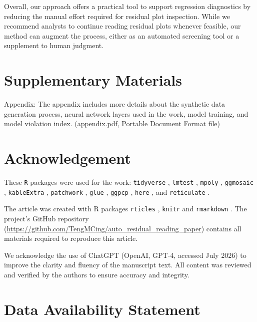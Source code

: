\documentclass[]{interact}
\theoremstyle{plain}%
\theoremstyle{definition}
\theoremstyle{remark}
\begin{document}
Overall, our approach offers a practical tool to support regression
diagnostics by reducing the manual effort required for residual plot
inspection. While we recommend analysts to continue reading residual
plots whenever feasible, our method can augment the process, either as
an automated screening tool or a supplement to human judgment.

\section*{Supplementary Materials}\label{supplementary-materials}

\begin{description}
\item{Appendix:} The appendix includes more details about the synthetic data generation process, neural network layers used in the work, model training, and model violation index. (appendix.pdf, Portable Document Format file)
\end{description}

\section*{Acknowledgement}\label{acknowledgement}

These \texttt{R} packages were used for the work: \texttt{tidyverse}
\citep{tidyverse}, \texttt{lmtest} \citep{lmtest}, \texttt{mpoly}
\citep{mpoly}, \texttt{ggmosaic} \citep{ggmosaic}, \texttt{kableExtra}
\citep{kableextra}, \texttt{patchwork} \citep{patchwork}, \texttt{glue}
\citep{glue}, \texttt{ggpcp} \citep{ggpcp}, \texttt{here} \citep{here},
and \texttt{reticulate} \citep{reticulate}.

The article was created with R packages \texttt{rticles}
\citep{rticles}, \texttt{knitr} \citep{knitr} and \texttt{rmarkdown}
\citep{rmarkdown}. The project's GitHub repository
(\url{https://github.com/TengMCing/auto_residual_reading_paper})
contains all materials required to reproduce this article.

We acknowledge the use of ChatGPT (OpenAI, GPT-4, accessed July 2026) to
improve the clarity and fluency of the manuscript text. All content was
reviewed and verified by the authors to ensure accuracy and integrity.

\section*{Data Availability
Statement}\label{data-availability-statement}
\end{document}
